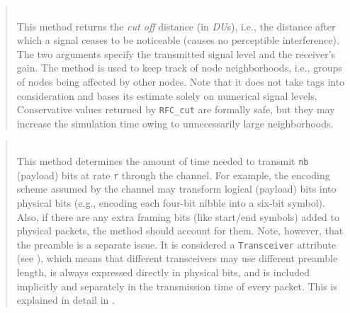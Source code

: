 \begin{quote}
\noindent{} \hspace{0in}\vspace{0.05in}\\
\noindent
This method returns the {\em cut off\/} distance (in {\em DU\/}s), i.e., the
distance after which a signal ceases to be noticeable (causes no perceptible
interference).
The two arguments specify the transmitted signal level
and the receiver's gain.
The method is used to keep track of node neighborhoods, i.e., groups of nodes
being affected by other nodes.
Note that it does not take tags into consideration and bases its estimate
solely on numerical signal levels.
Conservative values returned by {\tt RFC\_cut} are formally
safe, but they may increase
the simulation time owing to unnecessarily large neighborhoods.

\end{quote}

\begin{quote}
\noindent{} \hspace{0in}\vspace{0.05in}\\
\noindent
This method determines the amount of time needed to transmit {\tt nb} (payload)
bits at rate {\tt r} through the channel.
For example, the encoding scheme assumed by the channel may transform
logical (payload) bits into physical bits (e.g., encoding each four-bit nibble
into a six-bit symbol).
Also, if there are any extra framing bits (like start/end symbols) added to
physical packets, the method should account for them.
Note, however, that the preamble is a separate issue.
It is considered a {\tt Transceiver} attribute (see ),
which means that different transceivers may use
different preamble length, is always expressed directly in physical bits,
and is included implicitly and
separately in the transmission time of every packet.
This is explained in detail in .
\end{quote}

